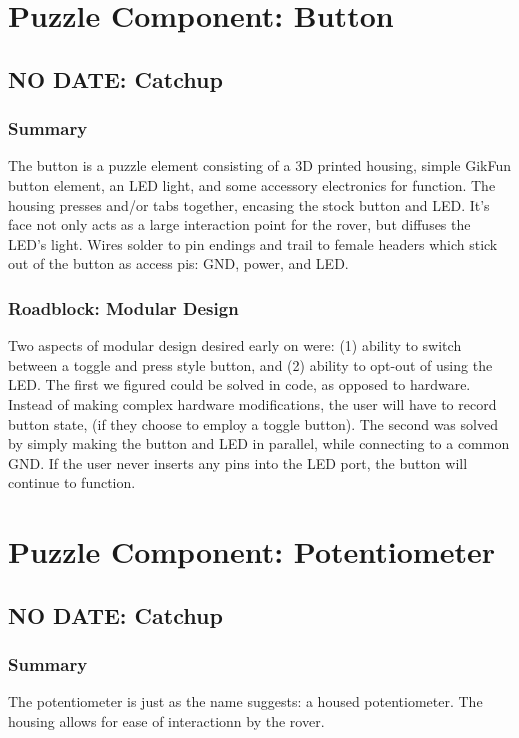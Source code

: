 \documentclass[a4paper, 10pt]{article}
\begin{document}
\section{Puzzle Component: Button}
	\subsection{NO DATE: Catchup}
		\subsubsection{Summary}
		The button is a puzzle element consisting of a 3D printed housing, simple GikFun button element, an LED light, and some accessory electronics for function. The housing presses and/or tabs together, encasing the stock button and LED. It's face not only acts as a large interaction point for the rover, but diffuses the LED's light. Wires solder to pin endings and trail to female headers which stick out of the button as access pis: GND, power, and LED. 
		\subsubsection{Roadblock: Modular Design}
		Two aspects of modular design desired early on were: (1) ability to switch between a toggle and press style button, and (2) ability to opt-out of using the LED. The first we figured could be solved in code, as opposed to hardware. Instead of making complex hardware modifications, the user will have to record button state, (if they choose to employ a toggle button). The second was solved by simply making the button and LED in parallel, while connecting to a common GND. If the user never inserts any pins into the LED port, the button will continue to function.

\section{Puzzle Component: Potentiometer}
	\subsection{NO DATE: Catchup}
		\subsubsection{Summary}
		The potentiometer is just as the name suggests: a housed potentiometer. The housing allows for ease of interactionn by the rover. 
\end{document}
